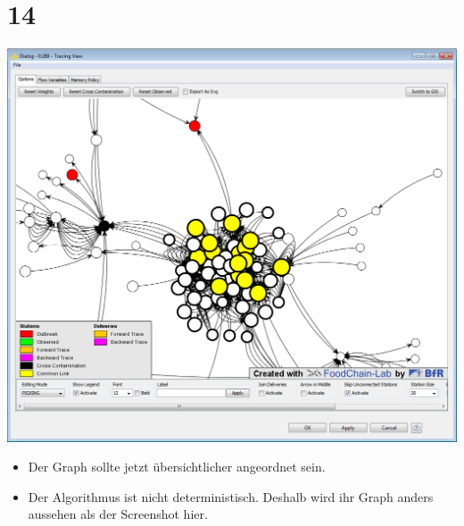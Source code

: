 \documentclass{beamer}
\begin{document}
\section{14}
\begin{frame}
	\begin{center}
  		\includegraphics[height=0.6\textheight]{14.png}
	\end{center}
	\begin{itemize}
		\item Der Graph sollte jetzt übersichtlicher angeordnet sein.
		\item Der Algorithmus ist nicht deterministisch. Deshalb wird ihr Graph anders aussehen als der Screenshot hier.
	\end{itemize}
\end{frame}
\end{document}
